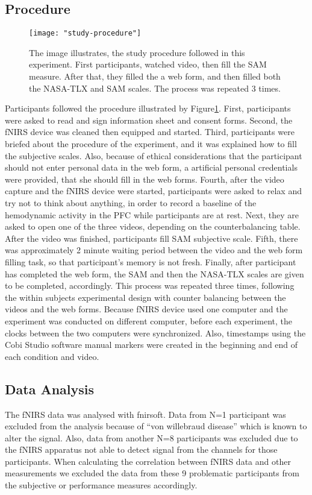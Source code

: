 \documentclass[../main/Feedback.tex]{subfiles}
\begin{document}
\subsection{Procedure}
\begin{figure}[h]
	\centering
	\texttt{[image: "study-procedure"]}
	\caption[study procedure]{The image illustrates, the study procedure followed in this experiment. First participants, watched video, then fill the SAM measure. After that, they filled the a web form, and then filled both the NASA-TLX and SAM scales. The process was repeated 3 times.}
	\label{fig:study-procedure}
\end{figure}		
Participants followed the procedure illustrated by Figure\ref{fig:study-procedure}. First, participants were asked to read and sign information sheet and consent forms. Second, the fNIRS device was cleaned then equipped and started. Third, participants were briefed about the procedure of the experiment, and it was explained how to fill the subjective scales. Also, because of ethical considerations that the participant should not enter personal data in the web form, a artificial personal credentials were provided, that she should fill in the web forms. Fourth, after the video capture and the fNIRS device were started, participants were asked to relax and try not to think about anything, in order to record a baseline of the hemodynamic activity in the PFC while participants are at rest. Next, they are asked to open one of the three videos, depending on the counterbalancing table. After the video was finished, participants fill SAM subjective scale. Fifth, there was approximately 2 minute waiting period between the video and the web form filling task, so that participant's memory is not fresh. Finally, after participant has completed the web form, the SAM and then the NASA-TLX scales are given to be completed, accordingly. This process was repeated three times, following the within subjects experimental design with counter balancing between the videos and the web forms. Because fNIRS device used one computer and the experiment was conducted on different computer, before each experiment, the clocks between the two computers were synchronized. Also, timestamps using the Cobi Studio software manual markers were created in the beginning and end of each condition and video. 
\subsection{Data Analysis}
The fNIRS data was analysed with fnirsoft\cite{ayazfunctional}. Data from N=1 participant was excluded from the analysis because of ``von willebraud disease'' which is known to alter the signal. Also, data from another N=8 participants was excluded due to the fNIRS apparatus not able to detect signal from the channels for those participants. When calculating the correlation between fNIRS data and other measurements we excluded the data from these 9 problematic participants from the subjective or performance measures accordingly.
\end{document}
